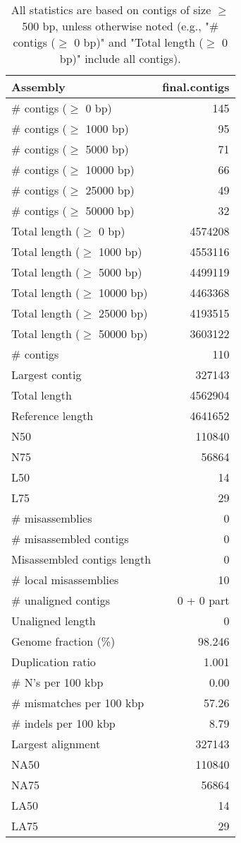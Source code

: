 \documentclass[12pt,a4paper]{article}
\begin{document}
\begin{table}[ht]
\begin{center}
\caption{All statistics are based on contigs of size $\geq$ 500 bp, unless otherwise noted (e.g., "\# contigs ($\geq$ 0 bp)" and "Total length ($\geq$ 0 bp)" include all contigs).}
\begin{tabular}{|l*{1}{|r}|}
\hline
Assembly & final.contigs \\ \hline
\# contigs ($\geq$ 0 bp) & 145 \\ \hline
\# contigs ($\geq$ 1000 bp) & 95 \\ \hline
\# contigs ($\geq$ 5000 bp) & 71 \\ \hline
\# contigs ($\geq$ 10000 bp) & 66 \\ \hline
\# contigs ($\geq$ 25000 bp) & 49 \\ \hline
\# contigs ($\geq$ 50000 bp) & 32 \\ \hline
Total length ($\geq$ 0 bp) & 4574208 \\ \hline
Total length ($\geq$ 1000 bp) & 4553116 \\ \hline
Total length ($\geq$ 5000 bp) & 4499119 \\ \hline
Total length ($\geq$ 10000 bp) & 4463368 \\ \hline
Total length ($\geq$ 25000 bp) & 4193515 \\ \hline
Total length ($\geq$ 50000 bp) & 3603122 \\ \hline
\# contigs & 110 \\ \hline
Largest contig & 327143 \\ \hline
Total length & 4562904 \\ \hline
Reference length & 4641652 \\ \hline
N50 & 110840 \\ \hline
N75 & 56864 \\ \hline
L50 & 14 \\ \hline
L75 & 29 \\ \hline
\# misassemblies & 0 \\ \hline
\# misassembled contigs & 0 \\ \hline
Misassembled contigs length & 0 \\ \hline
\# local misassemblies & 10 \\ \hline
\# unaligned contigs & 0 + 0 part \\ \hline
Unaligned length & 0 \\ \hline
Genome fraction (\%) & 98.246 \\ \hline
Duplication ratio & 1.001 \\ \hline
\# N's per 100 kbp & 0.00 \\ \hline
\# mismatches per 100 kbp & 57.26 \\ \hline
\# indels per 100 kbp & 8.79 \\ \hline
Largest alignment & 327143 \\ \hline
NA50 & 110840 \\ \hline
NA75 & 56864 \\ \hline
LA50 & 14 \\ \hline
LA75 & 29 \\ \hline
\end{tabular}
\end{center}
\end{table}
\end{document}
